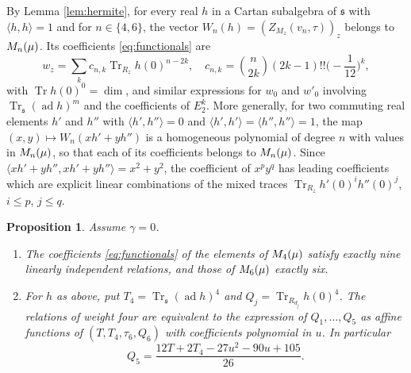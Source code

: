 \documentclass[leqno]{article}
\let\cal\relax
\newcommand{\cal}{\mathcal}
\renewcommand{\leq}{\ensuremath{\leqslant}}
\newtheorem{prop}[thm]{Proposition}
\numberwithin{equation}{section}
\begin{document}
By Lemma \ref{lem:hermite}, for every real $h$ in a Cartan subalgebra of $\mathfrak s$ with $\langle h,h\rangle = 1$ and for $n \in \{4,6\}$, the vector $W_n(h) = (Z_{M_z}(v_n,\tau))_z$ belongs to $\cal M_n(\mu)$. Its coefficients \eqref{eq:functionals} are
\begin{equation}
\label{eq:wn-coefficients}
w_z = \sum_{k}c_{n,k}\operatorname{Tr}_{R_z}h(0)^{n-2k},\quad c_{n,k} = \binom{n}{2k}(2k-1)!!\Big(-\frac{1}{12}\Big)^k,
\end{equation}
with $\operatorname{Tr}h(0)^0 = \dim$, and similar expressions for $w_0$ and $w'_0$ involving $\operatorname{Tr}_{\mathfrak s}(\operatorname{ad}h)^{m}$ and the coefficients of $E_2^k$. More generally, for two commuting real elements $h'$ and $h''$ with $\langle h',h''\rangle = 0$ and $\langle h',h'\rangle = \langle h'',h''\rangle = 1$, the map $(x,y) \mapsto W_n(xh'+yh'')$ is a homogeneous polynomial of degree $n$ with values in $\cal M_n(\mu)$, so that each of its coefficients belongs to $\cal M_n(\mu)$. Since $\langle xh'+yh'',xh'+yh''\rangle = x^2+y^2$, the coefficient of $x^py^q$ has leading coefficients which are explicit linear combinations of the mixed traces $\operatorname{Tr}_{R_z}h'(0)^ih''(0)^j$, $i \leq p$, $j \leq q$.

\begin{prop}
\label{prop:higher-relations}
Assume $\gamma = 0$.
\begin{enumerate}
\item The coefficients \eqref{eq:functionals} of the elements of $\cal M_4(\mu)$ satisfy exactly nine linearly independent relations, and those of $\cal M_6(\mu)$ exactly six.
\item For $h$ as above, put $T_4 = \operatorname{Tr}_{\mathfrak s}(\operatorname{ad}h)^4$ and $Q_j = \operatorname{Tr}_{R_{d_j}}h(0)^4$. The relations of weight four are equivalent to the expression of $Q_1,\ldots,Q_5$ as affine functions of $(T,T_4,\tau_6,Q_6)$ with coefficients polynomial in $u$. In particular
\begin{equation}
\label{eq:Q5}
Q_5 = \frac{12T+2T_4-27u^2-90u+105}{26}.
\end{equation}
\end{enumerate}
\end{prop}
\end{document}
